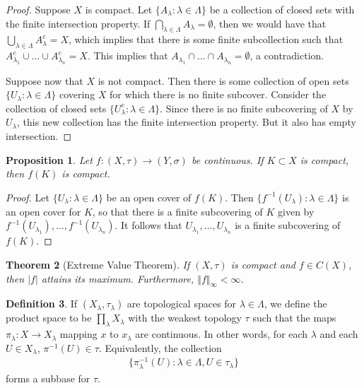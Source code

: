 \documentclass[11pt]{amsart}
\newtheorem{theorem}{Theorem}[section]
\newtheorem{proposition}[theorem]{Proposition}
\theoremstyle{definition}
\newtheorem{definition}[theorem]{Definition}
\numberwithin{equation}{section}
\begin{document}
\begin{proof}
    Suppose $X$ is compact. Let $\{A_\lambda:\lambda\in\Lambda\}$ be a collection of closed sets with the finite intersection property. If $\bigcap_{\lambda\in\Lambda}A_\lambda=\emptyset$, then we would have that $\bigcup_{\lambda\in\Lambda}A_\lambda^c=X$, which implies that there is some finite subcollection such that $A_{\lambda_1}^c\cup\ldots\cup A_{\lambda_n}^c=X$. This implies that $A_{\lambda_1}\cap \ldots\cap A_{\lambda_n}=\emptyset$, a contradiction.

    Suppose now that $X$ is not compact. Then there is some collection of open sets $\{U_\lambda:\lambda\in\Lambda\}$ covering $X$ for which there is no finite subcover. Consider the collection of closed sets $\{U_{\lambda}^c:\lambda\in\Lambda\}$. Since there is no finite subcovering of $X$ by $U_\lambda$, this new collection has the finite intersection property. But it also has empty intersection.
\end{proof}
\begin{proposition}
    Let $f:(X,\tau)\to(Y,\sigma)$ be continuous. If $K\subset X$ is compact, then $f(K)$ is compact.
\end{proposition}
\begin{proof}
    Let $\{U_\lambda:\lambda\in\Lambda\}$ be an open cover of $f(K)$. Then $\{f^{-1}(U_\lambda):\lambda\in\Lambda\}$ is an open cover for $K$, so that there is a finite subcovering of $K$ given by $f^{-1}(U_{\lambda_1}),\ldots,f^{-1}(U_{\lambda_n})$. It follows that $U_{\lambda_1},\ldots,U_{\lambda_n}$ is a finite subcovering of $f(K)$.
\end{proof}
\begin{theorem}[Extreme Value Theorem]
    If $(X,\tau)$ is compact and $f\in C(X)$, then $|f|$ attains its maximum. Furthermore, $\Vert f\Vert_\infty<\infty$.
\end{theorem}
\begin{definition}
    If $(X_\lambda,\tau_\lambda)$ are topological spaces for $\lambda\in\Lambda$, we define the product space to be $\prod_{\lambda}X_\lambda$ with the weakest topology $\tau$ such that the maps $\pi_{\lambda}:X\to X_\lambda$ mapping $x$ to $x_\lambda$ are continuous. In other words, for each $\lambda$ and each $U\in X_\lambda$, $\pi^{-1}(U)\in \tau$. Equivalently, the collection
    \begin{align*}
        \{\pi_\lambda^{-1}(U):\lambda\in\Lambda,U\in \tau_\lambda\}
    \end{align*}
    forms a subbase for $\tau$.
\end{definition}
\end{document}

